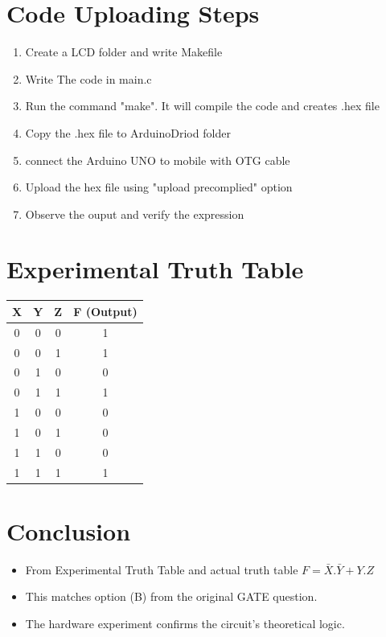 \documentclass[a4paper,12pt]{article}
\begin{document}
\section*{Code Uploading Steps}
\begin{enumerate}
        \item Create a LCD folder and write Makefile
        \item Write The code in main.c
        \item Run the command "make". It will compile the code and creates .hex file
        \item Copy the .hex file to ArduinoDriod folder
        \item connect the Arduino UNO to mobile with OTG cable
        \item Upload the hex file using "upload precomplied" option
        \item Observe the ouput and verify the expression
\end{enumerate}
\section*{Experimental Truth Table}
\begin{table}[H]
\centering
\begin{tabular}{|c|c|c|c|}
\hline
X & Y & Z & F (Output) \\ \hline
0 & 0 & 0 & 1 \\
0 & 0 & 1 & 1 \\
0 & 1 & 0 & 0 \\
0 & 1 & 1 & 1 \\
1 & 0 & 0 & 0 \\
1 & 0 & 1 & 0 \\
1 & 1 & 0 & 0 \\
1 & 1 & 1 & 1 \\
\hline
\end{tabular}
\end{table}
\section*{Conclusion}
\begin{itemize}
        \item From Experimental Truth Table and actual truth table $F=\bar{X}.\bar{Y}+Y.Z$
        \item This matches option (B) from the original GATE question.
        \item The hardware experiment confirms the circuit's theoretical logic.
\end{itemize}
\end{document}
